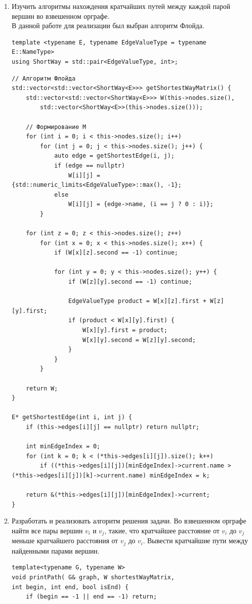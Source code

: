 \documentclass[a4paper,14pt]{extarticle}
\begin{document}
\begin{enumerate}[1.]
    \item Изучить алгоритмы нахождения кратчайших путей между 
    каждой парой вершин во взвешенном орграфе.\\
    В данной работе для реализации был выбран алгоритм Флойда.
        \begin{verbatim}
template <typename E, typename EdgeValueType = typename E::NameType>
using ShortWay = std::pair<EdgeValueType, int>;
        \end{verbatim}
        \begin{verbatim}
// Алгоритм Флойда
std::vector<std::vector<ShortWay<E>>> getShortestWayMatrix() {
    std::vector<std::vector<ShortWay<E>>> W(this->nodes.size(), 
        std::vector<ShortWay<E>>(this->nodes.size()));

    // Формирование M
    for (int i = 0; i < this->nodes.size(); i++) 
        for (int j = 0; j < this->nodes.size(); j++) {
            auto edge = getShortestEdge(i, j);
            if (edge == nullptr) 
                W[i][j] = {std::numeric_limits<EdgeValueType>::max(), -1};
            else 
                W[i][j] = {edge->name, (i == j ? 0 : i)};
        } 

    for (int z = 0; z < this->nodes.size(); z++) 
        for (int x = 0; x < this->nodes.size(); x++) {
            if (W[x][z].second == -1) continue;

            for (int y = 0; y < this->nodes.size(); y++) {
                if (W[z][y].second == -1) continue;

                EdgeValueType product = W[x][z].first + W[z][y].first;
                if (product < W[x][y].first) {
                    W[x][y].first = product;
                    W[x][y].second = W[z][y].second;
                }
            }
        }
    
    return W;
}

E* getShortestEdge(int i, int j) {
    if (this->edges[i][j] == nullptr) return nullptr;

    int minEdgeIndex = 0;
    for (int k = 0; k < (*this->edges[i][j]).size(); k++) 
        if ((*this->edges[i][j])[minEdgeIndex]->current.name > (*this->edges[i][j])[k]->current.name) minEdgeIndex = k;

    return &(*this->edges[i][j])[minEdgeIndex]->current;
}
        \end{verbatim}
        \item Разработать и реализовать алгоритм решения задачи.\bigbreak
        Во взвешенном орграфе найти все пары вершин $v_i$ и $v_j$, такие,
что кратчайшее расстояние от $v_i$ до $v_j$ меньше кратчайшего расстояния
от $v_j$ до $v_i$. Вывести кратчайшие пути между найденными парами вершин.\\
        \begin{verbatim}
template<typename G, typename W>
void printPath( G& graph, W shortestWayMatrix, 
int begin, int end, bool isEnd) {
    if (begin == -1 || end == -1) return;


\end{verbatim}
\end{enumerate}
\end{document}
